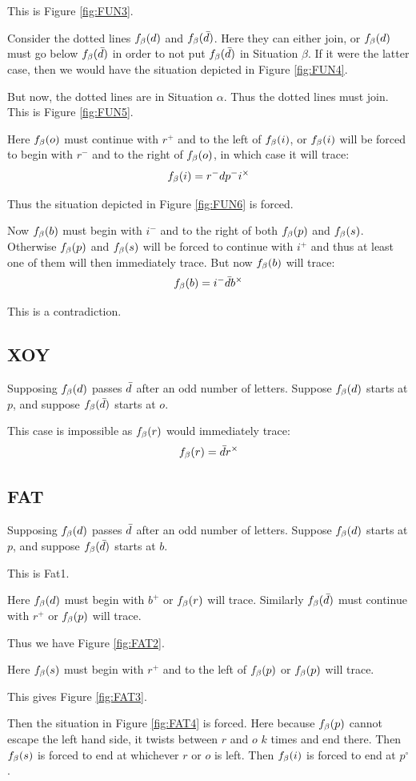 This is Figure \ref{fig:FUN3}.

Consider the dotted lines $f_\beta(d)$ and $f_\beta(\bar{d})$. Here they can either join, or $f_\beta(d)$ must go below $f_\beta(\bar{d})$ in order to not put $f_\beta(\bar{d})$ in Situation $\beta$. If it were the latter case, then we would have the situation depicted in Figure \ref{fig:FUN4}.

But now, the dotted lines are in Situation $\alpha$. Thus the dotted lines must join. This is Figure \ref{fig:FUN5}. 

Here $f_\beta(o)$ must continue with $r^+$ and to the left of $f_\beta(i)$, or $f_\beta(i)$ will be forced to begin with $r^-$ and to the right of $f_\beta(o)$, in which case it will trace:
\[
f_\beta(i) = r^- d p^- i^\times
\]

Thus the situation depicted in Figure \ref{fig:FUN6} is forced.

Now $f_\beta(b)$ must begin with $i^-$ and to the right of both $f_\beta(p)$ and $f_\beta(s)$. Otherwise $f_\beta(p)$ and $f_\beta(s)$ will be forced to continue with $i^+$ and thus at least one of them will then immediately trace. But now $f_\beta(b)$ will trace:
\[
f_\beta(b) = i^- \bar{d} b^\times
\]

This is a contradiction.

\subsection{XOY}
Supposing $f_\beta(d)$ passes $\bar{d}$ after an odd number of letters. Suppose $f_\beta(d)$ starts at $p$, and suppose $f_\beta(\bar{d})$ starts at $o$. 

This case is impossible as $f_\beta(r)$ would immediately trace:
\[
f_\beta(r) = \bar{d} r^\times
\]

\subsection{FAT}\label{FAT}
Supposing $f_\beta(d)$ passes $\bar{d}$ after an odd number of letters. Suppose $f_\beta(d)$ starts at $p$, and suppose $f_\beta(\bar{d})$ starts at $b$.

This is Fat1.

Here $f_\beta(d)$ must begin with $b^+$ or $f_\beta(r)$ will trace. Similarly $f_\beta(\bar{d})$ must continue with $r^+$ or $f_\beta(p)$ will trace.

Thus we have Figure \ref{fig:FAT2}.

Here $f_\beta(s)$ must begin with $r^+$ and to the left of $f_\beta(p)$ or $f_\beta(p)$ will trace.

This gives Figure \ref{fig:FAT3}.

Then the situation in Figure \ref{fig:FAT4} is forced. Here because $f_\beta(p)$ cannot escape the left hand side, it twists between $r$ and $o$ $k$ times and end there. Then $f_\beta(s)$ is forced to end at whichever $r$ or $o$ is left. Then $f_\beta(i)$ is forced to end at $p^\circ$.

